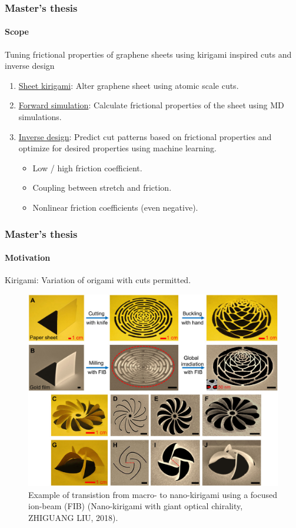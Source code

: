 \documentclass[
	10pt, %
]{beamer}
\begin{document}
\begin{frame}
	\frametitle{Master's thesis}
	\framesubtitle{Scope}

 
	{\large Tuning frictional properties of graphene sheets using kirigami inspired cuts and inverse design}
	\newline
	


	\begin{enumerate}
		\setlength\itemsep{2em}
		\item \underline{Sheet kirigami}: Alter graphene sheet using atomic scale cuts. %
		\item \underline{Forward simulation}: Calculate frictional properties of the sheet using MD simulations.
		\item \underline{Inverse design}: Predict cut patterns based on frictional properties and optimize for desired properties using machine learning.
		\begin{itemize}
			\item Low / high friction coefficient.
			\item Coupling between stretch and friction.
			\item Nonlinear friction coefficients (even negative).
		\end{itemize} 
	\end{enumerate}
\end{frame}



\begin{frame}
	\frametitle{Master's thesis}
	\framesubtitle{Motivation}

	Kirigami: Variation of origami with cuts permitted.

	\begin{figure}
		\includegraphics[width=0.6\linewidth]{figures/kirigami_example.jpeg}
		\caption{Example of transistion from macro- to nano-kirigami using a focused ion-beam (FIB) (Nano-kirigami with giant optical chirality, ZHIGUANG LIU, 2018).}
	\end{figure}	

\end{frame}
\end{document}
